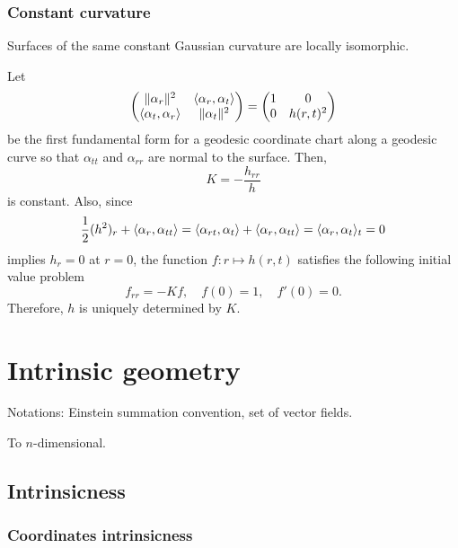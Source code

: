 \documentclass{../exp}
\def\a{\alpha}
\begin{document}






\subsubsection{Constant curvature}


\begin{thm}
Surfaces of the same constant Gaussian curvature are locally isomorphic.
\end{thm}
\begin{pf}
Let
\[\mat{\|\a_r\|^2&\<\a_r,\a_t\>\\\<\a_t,\a_r\>&\|\a_t\|^2}=\mat{1&0\\0&h(r,t)^2}\]
be the first fundamental form for a geodesic coordinate chart along a geodesic curve so that $\a_{tt}$ and $\a_{rr}$ are normal to the surface.
Then,
\[K=-\frac{h_{rr}}h\]
is constant.
Also, since
\[\frac12(h^2)_r+\<\a_r,\a_{tt}\>=\<\a_{rt},\a_t\>+\<\a_r,\a_{tt}\>=\<\a_r,\a_t\>_t=0\]
implies $h_r=0$ at $r=0$, the function $f:r\mapsto h(r,t)$ satisfies the following initial value problem
\[f_{rr}=-Kf,\quad f(0)=1,\quad f'(0)=0.\]
Therefore, $h$ is uniquely determined by $K$.
\end{pf}














\section{Intrinsic geometry}
Notations: Einstein summation convention, set of vector fields.

To $n$-dimensional.

\subsection{Intrinsicness}
\subsubsection{Coordinates intrinsicness}
\end{document}
